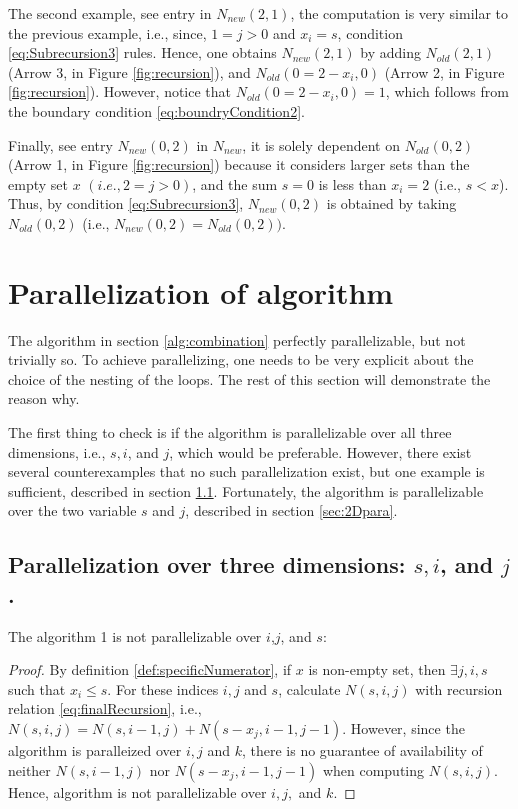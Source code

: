 \documentclass[a4paper]{article}
\begin{document}
The second example, see entry  in $N_{new}(2,1)$, the computation is very similar to the previous example, i.e., since, $1=j>0$ and $x_{i}=s$, condition \ref{eq:Subrecursion3} rules. Hence, one obtains $N_{new}(2,1)$ by adding $N_{old}(2,1)$ (Arrow 3, in Figure \ref{fig:recursion}), and $N_{old}(0=2-x_{i},0)$ (Arrow 2, in Figure \ref{fig:recursion}). However, notice that $N_{old}(0=2-x_{i},0)=1$, which follows from the boundary condition \ref{eq:boundryCondition2}.

Finally, see entry $N_{new}(0,2)$ in $N_{new}$, it is solely dependent on $N_{old}(0,2)$ (Arrow 1, in Figure \ref{fig:recursion}) because it considers larger sets than the empty set $x$ $(i.e., 2=j>0)$, and the sum $s=0$ is less than $x_{i}=2$ (i.e., $s<x$). Thus, by condition \ref{eq:Subrecursion3},  $N_{new}(0,2)$ is obtained by taking $N_{old}(0,2)$ (i.e., $N_{new}(0,2)=N_{old}(0,2)).$

\section{Parallelization of algorithm}
\label{sec:paraAlgo}
The algorithm in section \ref{alg:combination} perfectly parallelizable, but not trivially so. To achieve parallelizing, one needs to be very explicit about the choice of the nesting of the loops. The rest of this section will demonstrate the reason why.

The first thing to check is if the algorithm is parallelizable over all three dimensions, i.e., $s, i$, and $j$, which would be preferable. However, there exist several counterexamples that no such parallelization exist, but one example is sufficient, described in section \ref{sec:3Dpara}. Fortunately, the algorithm is parallelizable over the two variable $s$ and $j$, described in section \ref{sec:2Dpara}.

\subsection{Parallelization over three dimensions: $s, i$, and $j$.}
\label{sec:3Dpara}
The algorithm 1 is not parallelizable over $i$,$j$, and $s$: 
\begin{proof}

By definition \ref{def:specificNumerator}, if $x$ is non-empty set, then $\exists j,i,s$ such that $x_i \leq s$. For these indices $i,j$ and $s$, calculate $N(s,i,j)$ with recursion relation \ref{eq:finalRecursion}, i.e., $N(s,i,j)=N(s,i-1,j) + N(s-x_{j},i-1,j-1)$. However, since the algorithm is paralleized over $i,j$ and $k$, there is no guarantee of availability of neither $N(s,i-1,j)$ nor $N(s-x_{j},i-1,j-1)$ when computing $N(s,i,j)$. Hence, algorithm is not parallelizable over $i,j,$ and $k$.
\end{proof}
\end{document}
